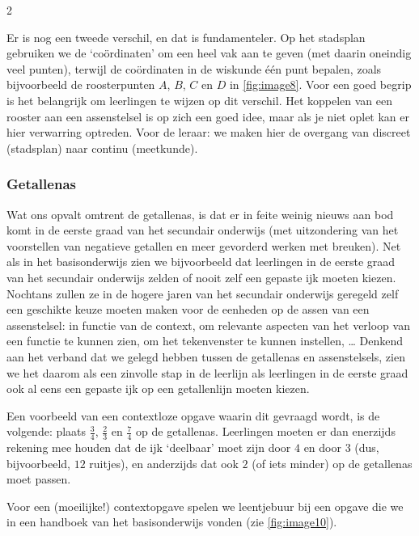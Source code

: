 \begin{multicols}{2}

Er is nog een tweede verschil, en dat is fundamenteler.
Op het stadsplan gebruiken we de `coördinaten' om een heel vak aan te geven (met daarin oneindig veel punten), terwijl de coördinaten in de wiskunde één punt bepalen, zoals bijvoorbeeld de roosterpunten \(A\), \(B\), \(C\) en \(D\) in \autoref{fig:image8}.
Voor een goed begrip is het belangrijk om leerlingen te wijzen op dit verschil.
Het koppelen van een rooster aan een assenstelsel is op zich een goed idee, maar als je niet oplet kan er hier verwarring optreden.
Voor de leraar: we maken hier de overgang van discreet (stadsplan) naar continu (meetkunde).

\subsubsection*{Getallenas}

Wat ons opvalt omtrent de getallenas, is dat er in feite weinig nieuws aan bod komt in de eerste graad van het secundair onderwijs (met uitzondering van het voorstellen van negatieve getallen en meer gevorderd werken met breuken).
Net als in het basisonderwijs zien we bijvoorbeeld dat leerlingen in de eerste graad van het secundair onderwijs zelden of nooit zelf een gepaste ijk moeten kiezen.
Nochtans zullen ze in de hogere jaren van het secundair onderwijs geregeld zelf een geschikte keuze moeten maken voor de eenheden op de assen van een assenstelsel: in functie van de context, om relevante aspecten van het verloop van een functie te kunnen zien, om het tekenvenster te kunnen instellen, \ldots{}
Denkend aan het verband dat we gelegd hebben tussen de getallenas en assenstelsels, zien we het daarom als een zinvolle stap in de leerlijn als leerlingen in de eerste graad ook al eens een gepaste ijk op een getallenlijn moeten kiezen.

Een voorbeeld van een contextloze opgave waarin dit gevraagd wordt, is de volgende: plaats \(\frac{3}{4}\), \(\frac{2}{3}\) en \(\frac{7}{4}\) op de getallenas.
Leerlingen moeten er dan enerzijds rekening mee houden dat de ijk `deelbaar' moet zijn door \(4\) en door \(3\) (dus, bijvoorbeeld, \(12\) ruitjes), en anderzijds dat ook \(2\) (of iets minder) op de getallenas moet passen.


Voor een (moeilijke!) contextopgave spelen we leentjebuur bij een opgave die we in een handboek van het basisonderwijs vonden (zie \autoref{fig:image10}).

\end{multicols}
